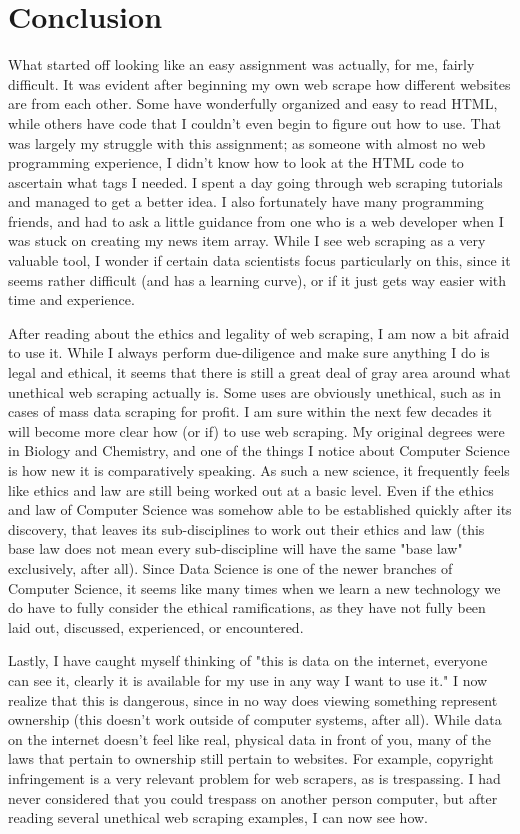 \documentclass[]{article}
\begin{document}
\section{Conclusion}
What started off looking like an easy assignment was actually, for me, fairly difficult.  It was evident after beginning my own web scrape how different websites are from each other.  Some have wonderfully organized and easy to read HTML, while others have code that I couldn't even begin to figure out how to use.  That was largely my struggle with this assignment; as someone with almost no web programming experience, I didn't know how to look at the HTML code to ascertain what tags I needed.  I spent a day going through web scraping tutorials and managed to get a better idea.  I also fortunately have many programming friends, and had to ask a little guidance from one who is a web developer when I was stuck on creating my news item array.  While I see web scraping as a very valuable tool, I wonder if certain data scientists focus particularly on this, since it seems rather difficult (and has a learning curve), or if it just gets way easier with time and experience.

After reading about the ethics and legality of web scraping, I am now a bit afraid to use it.  While I always perform due-diligence and make sure anything I do is legal and ethical, it seems that there is still a great deal of gray area around what unethical web scraping actually is.  Some uses are obviously unethical, such as in cases of mass data scraping for profit.  I am sure within the next few decades it will become more clear how (or if) to use web scraping.  My original degrees were in Biology and Chemistry, and one of the things I notice about Computer Science is how new it is comparatively speaking.  As such a new science, it frequently feels like ethics and law are still being worked out at a basic level.  Even if the ethics and law of Computer Science was somehow able to be established quickly after its discovery, that leaves its sub-disciplines to work out their ethics and law (this base law does not mean every sub-discipline will have the same "base law" exclusively, after all).  Since Data Science is one of the newer branches of Computer Science, it seems like many times when we learn a new technology we do have to fully consider the ethical ramifications, as they have not fully been laid out, discussed, experienced, or encountered.

Lastly, I have caught myself thinking of "this is data on the internet, everyone can see it, clearly it is available for my use in any way I want to use it." I now realize that this is dangerous, since in no way does viewing something represent ownership (this doesn't work outside of computer systems, after all).  While data on the internet doesn't feel like real, physical data in front of you, many of the laws that pertain to ownership still pertain to websites.  For example, copyright infringement is a very relevant problem for web scrapers, as is trespassing.  I had never considered that you could trespass on another person computer, but after reading several unethical web scraping examples, I can now see how.
\end{document}
